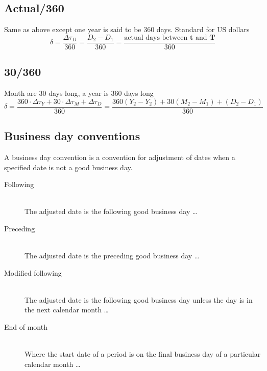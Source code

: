 \documentclass[11pt,a4paper]{article}
\numberwithin{equation}{section}
\begin{document}
\subsection{Actual/360}
Same as above except one year is said to be 360 days. Standard for US dollars
\[
\delta = \frac{\Delta \tau_D}{360} =\frac{D_2-D_1}{360} = \frac{\text{actual days between } \boldsymbol{t} \text{ and } \boldsymbol{T}}{360}
\]
\subsection{30/360}
Month are 30 days long, a year is 360 days long
\[
\delta = \frac{360 \cdot \Delta \tau_Y + 30 \cdot \Delta \tau_M + \Delta \tau_D}{360} =\frac{360(Y_2-Y_2)+30(M_2-M_1)+(D_2-D_1)}{360}
\]

\subsection{Business day conventions}
A business day convention is a convention for adjustment of dates when a specified date is not a good business day. 
\begin{description}
  \item[Following] \hfill \\
The adjusted date is the following good business day \ldots
  \item[Preceding] \hfill \\
    The adjusted date is the preceding good business day \ldots
  \item[Modified following] \hfill \\
  The adjusted date is the following good business day unless the day is in the next calendar month \ldots
  \item[End of month] \hfill \\
Where the start date of a period is on the final business day of a particular calendar month \ldots
\end{description}

\newpage



\end{document}
